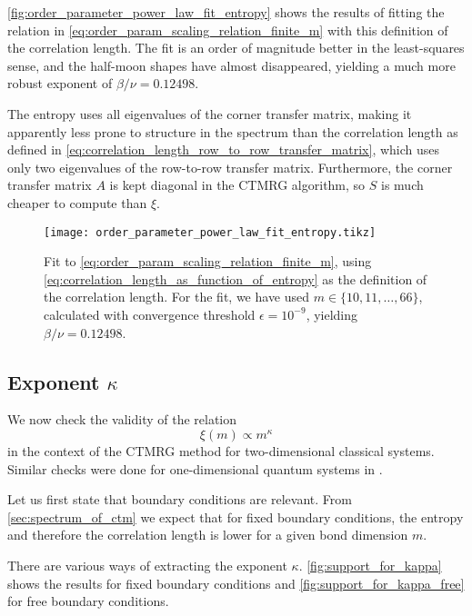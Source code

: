 \autoref{fig:order_parameter_power_law_fit_entropy} shows the results of fitting the relation in
\autoref{eq:order_param_scaling_relation_finite_m} with this definition of the correlation length. The fit is an order
of magnitude better in the least-squares sense, and the half-moon shapes have almost disappeared,
yielding a much more robust exponent of $\beta/\nu = 0.12498$.

The entropy uses all eigenvalues of the corner transfer matrix, making it apparently less prone to structure in the
spectrum than the correlation length as defined in \autoref{eq:correlation_length_row_to_row_transfer_matrix},
which uses only two eigenvalues of the row-to-row transfer matrix.
Furthermore, the corner transfer matrix $A$ is kept diagonal in the CTMRG algorithm,
so $S$ is much cheaper to compute than $\xi$.

\begin{figure}
  \texttt{[image: order\_parameter\_power\_law\_fit\_entropy.tikz]}
  \caption{Fit to
  \autoref{eq:order_param_scaling_relation_finite_m}, using \autoref{eq:correlation_length_as_function_of_entropy} as the
  definition of the correlation length.
  For the fit, we have used $m \in \{ 10, 11, \dots, 66 \}$, calculated with convergence threshold $\epsilon = 10^{-9}$, yielding $\beta/\nu = 0.12498$.}
  \label{fig:order_parameter_power_law_fit_entropy}
\end{figure}

\subsection{Exponent $\kappa$}

We now check the validity of the relation
\begin{equation}\label{eq:xi_propto_kappa_2}
  \xi(m) \propto m^{\kappa}
\end{equation}
in the context of the CTMRG method for two-dimensional
classical systems. Similar checks were done for one-dimensional quantum systems in \cite{tagliacozzo2008scaling}.

Let us first state that boundary conditions are relevant.
From \autoref{sec:spectrum_of_ctm} we expect that for fixed boundary conditions,
the entropy and therefore the correlation length is lower for a given bond dimension $m$.

There are various ways of extracting the exponent $\kappa$.
\autoref{fig:support_for_kappa} shows the results for fixed boundary conditions and \autoref{fig:support_for_kappa_free}
for free boundary conditions.

